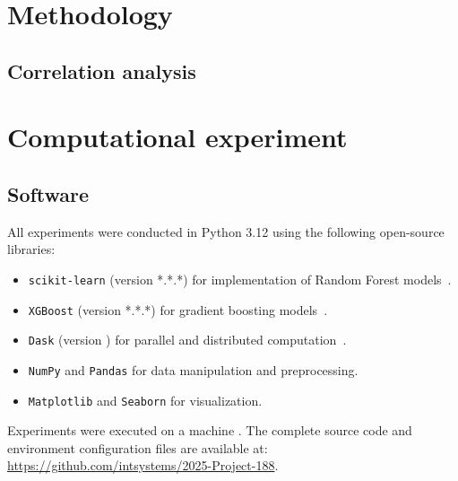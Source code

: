 \documentclass{article}
\begin{document}
\section{Methodology}
\label{sec:methodology}

\subsection{Correlation analysis}

\section{Computational experiment}
\label{sec:computational-experiment}

\subsection*{Software}
All experiments were conducted in Python 3.12 using the following open-source libraries:
\begin{itemize}
    \item \texttt{scikit-learn} (version *.*.*) for implementation of Random Forest models~\cite{pedregosaScikitlearnMachineLearning}.
    \item \texttt{XGBoost} (version *.*.*) for gradient boosting models~\cite{chenXGBoostScalableTree2016a}.
    \item \texttt{Dask} (version ) for parallel and distributed computation~\cite{rocklinDaskParallelComputation2015}.
    \item \texttt{NumPy} and \texttt{Pandas} for data manipulation and preprocessing.
    \item \texttt{Matplotlib} and \texttt{Seaborn} for visualization.
\end{itemize}
Experiments were executed on a machine . The complete source code and environment configuration files are available at: \url{https://github.com/intsystems/2025-Project-188}.
\end{document}
